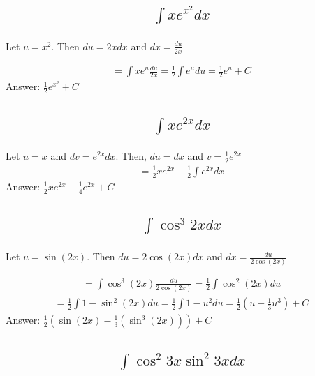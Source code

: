 \documentclass{article}
\begin{document}
\subsection{
	\begin{align*}
		\int{xe^{x^2}dx}
	\end{align*}
}

Let $u = x^2$. Then $du = 2xdx$ and $dx = \frac{du}{2x}$

\begin{align*}
	= \int{x e^u \frac{du}{2x}} = \frac{1}{2} \int{e^u du} = \frac{1}{2} e^u +C
\end{align*}
Answer: $ \frac{1}{2} e^{x^2} +C$


\subsection{
	\begin{align*}
		\int{x e^{2x}dx}
	\end{align*}
}

Let $u = x$ and $dv = e^{2x} dx$. Then, $du = dx$ and $v = \frac{1}{2} e^{2x}$
\begin{align*}
	= \frac{1}{2} x e^{2x} - \frac{1}{2} \int{e^{2x}dx} 
\end{align*}
Answer: $\frac{1}{2} x e^{2x} - \frac{1}{4} e^{2x} +C $

\subsection{
	\begin{align*}
		\int{\cos^3{2x}dx}
	\end{align*}
}

Let $u = \sin{(2x)}$. Then $du = 2 \cos{(2x)} dx$ and $dx = \frac{du}{2 \cos{(2x)}}$

\begin{align*}
	= \int{\cos^3{(2x)} \frac{du}{2 \cos{(2x)}}} = \frac{1}{2} \int{\cos^2{(2x)} du} 
\end{align*}
\begin{align*}
	=  \frac{1}{2} \int{1- \sin^2{(2x)} du} = \frac{1}{2} \int{1- u^2 du} = \frac{1}{2} (u - \frac{1}{3} u^3) + C
\end{align*}
Answer: $\frac{1}{2} (\sin{(2x)} - \frac{1}{3} (\sin^3{(2x)})) + C$

\subsection{
	\begin{align*}
		\int{\cos^2{3x} \sin^2{3x}dx}
	\end{align*}
}
\end{document}
